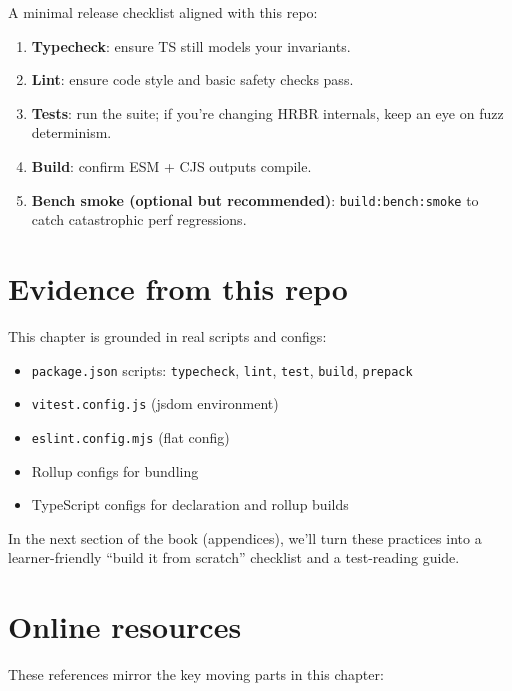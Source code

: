 A minimal release checklist aligned with this repo:

\begin{enumerate}
\item \textbf{Typecheck}: ensure TS still models your invariants.
\item \textbf{Lint}: ensure code style and basic safety checks pass.
\item \textbf{Tests}: run the suite; if you're changing HRBR internals, keep an eye on fuzz determinism.
\item \textbf{Build}: confirm ESM + CJS outputs compile.
\item \textbf{Bench smoke (optional but recommended)}: \texttt{build:bench:smoke} to catch catastrophic perf regressions.
\end{enumerate}

\section{Evidence from this repo}

This chapter is grounded in real scripts and configs:

\begin{itemize}
\item \texttt{package.json} scripts: \texttt{typecheck}, \texttt{lint}, \texttt{test}, \texttt{build}, \texttt{prepack}
\item \texttt{vitest.config.js} (jsdom environment)
\item \texttt{eslint.config.mjs} (flat config)
\item Rollup configs for bundling
\item TypeScript configs for declaration and rollup builds
\end{itemize}

In the next section of the book (appendices), we'll turn these practices into a learner-friendly ``build it from scratch'' checklist and a test-reading guide.

\section{Online resources}

These references mirror the key moving parts in this chapter:


